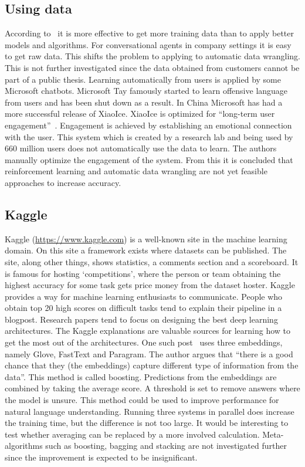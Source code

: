 \subsection{Using data}
\label{subsec:using_data}
According to~\citet{warden2018} it is more effective to get more training data than to apply better models and algorithms.
For conversational agents in company settings it is easy to get raw data.
This shifts the problem to applying to automatic data wrangling.
This is not further investigated since the data obtained from customers cannot be part of a public thesis.
Learning automatically from users is applied by some Microsoft chatbots.
Microsoft Tay famously started to learn offensive language from users and has been shut down as a result.
In China Microsoft has had a more successful release of XiaoIce.
XiaoIce is optimized for ``long-term user engagement''~\citep{zhou2018design}.
Engagement is achieved by establishing an emotional connection with the user.
This system which is created by a research lab and being used by 660 million users does not automatically use the data to learn.
The authors manually optimize the engagement of the system.
From this it is concluded that reinforcement learning and automatic data wrangling are not yet feasible approaches to increase accuracy.

\subsection{Kaggle}
\label{subsec:kaggle}
Kaggle (\url{https://www.kaggle.com}) is a well-known site in the machine learning domain.
On this site a framework exists where datasets can be published.
The site, along other things, shows statistics, a comments section and a scoreboard.
It is famous for hosting `competitions', where the person or team obtaining the highest accuracy for some task gets price money from the dataset hoster.
Kaggle provides a way for machine learning enthusiasts to communicate.
People who obtain top 20 high scores on difficult tasks tend to explain their pipeline in a blogpost.
Research papers tend to focus on designing the best deep learning architectures.
The Kaggle explanations are valuable sources for learning how to get the most out of the architectures.
One such post~\citep{kumar2018} uses three embeddings, namely Glove, FastText and Paragram.
The author argues that ``there is a good chance that they (the embeddings) capture different type of information from the data''.
This method is called boosting.
Predictions from the embeddings are combined by taking the average score.
A threshold is set to remove answers where the model is unsure.
This method could be used to improve performance for natural language understanding.
Running three systems in parallel does increase the training time, but the difference is not too large.
It would be interesting to test whether averaging can be replaced by a more involved calculation.
Meta-algorithms such as boosting, bagging and stacking are not investigated further since the improvement is expected to be insignificant.

